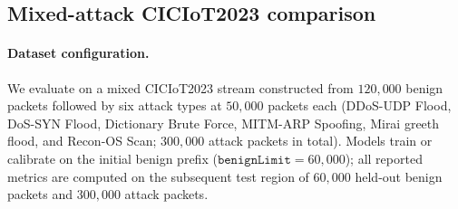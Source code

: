 %
%
%

\subsection{Mixed-attack CICIoT2023 comparison}
\label{sec:cic-mixed-baselines}

\paragraph{Dataset configuration.}
We evaluate on a mixed CICIoT2023 stream constructed from
$120{,}000$ benign packets followed by six attack types at $50{,}000$ packets each
(DDoS-UDP Flood, DoS-SYN Flood, Dictionary Brute Force, MITM-ARP Spoofing,
Mirai greeth flood, and Recon-OS Scan; $300{,}000$ attack packets in total).
Models train or calibrate on the initial benign prefix
($\texttt{benignLimit}{=}60{,}000$);
all reported metrics are computed on the subsequent test region of
$60{,}000$ held-out benign packets and $300{,}000$ attack packets.

